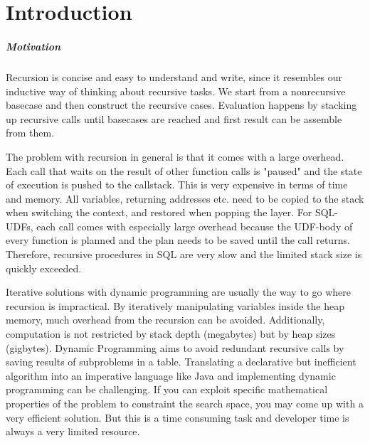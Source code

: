 \chapter{Introduction}\label{Introduction}


\paragraph*{Motivation} Recursion is concise and easy to understand and write, since it resembles our inductive way of thinking about recursive tasks. We start from a nonrecursive basecase and then construct the recursive cases. Evaluation happens by stacking up recursive calls until basecases are reached and first result can be assemble from them.

The problem with recursion in general is that it comes with a large overhead. Each call that waits on the result of other function calls is "paused" and the state of execution is pushed to the callstack. This is very expensive in terms of time and memory. All variables, returning addresses etc. need to be copied to the stack when switching the context, and restored when popping the layer. For SQL-UDFs, each call comes with especially large overhead because the UDF-body of every function is planned and the plan needs to be saved until the call returns. Therefore, recursive procedures in SQL are very slow and the limited stack size is quickly exceeded.

Iterative solutions with dynamic programming are usually the way to go where recursion is impractical. By iteratively manipulating variables inside the heap memory, much overhead from the recursion can be avoided. Additionally, computation is not restricted by stack depth (megabytes) but by heap sizes (gigbytes). Dynamic Programming aims to avoid redundant recursive calls by saving results of subproblems in a table. Translating a declarative but inefficient algorithm into an imperative language like Java and implementing dynamic programming can be challenging. If you can exploit specific mathematical properties of the problem to constraint the search space, you may come up with a very efficient solution. But this is a time consuming task and developer time is always a very limited resource.

